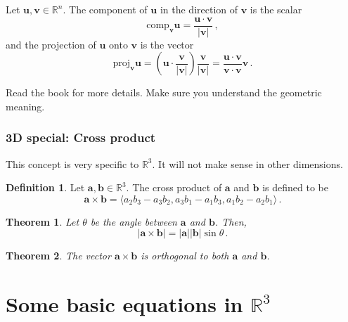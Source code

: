 \documentclass[
]{article}
\newtheorem{theorem}{Theorem}[section]
\theoremstyle{definition}
\newtheorem{definition}{Definition}[section]
\theoremstyle{definition}
\theoremstyle{definition}
\theoremstyle{definition}
\theoremstyle{remark}
\begin{document}
Let \(\textbf{u}, \textbf{v}\in \mathbb{R}^n\). The component of \(\textbf{u}\)
in the direction of \(\textbf{v}\) is the scalar
\begin{equation*}
\mathrm{comp}_{\mathbf{v}}\mathbf{u} = \frac{\mathbf{u}\cdot \mathbf{v}}{|\mathbf{v}|} \,,
\end{equation*}
and the projection of \(\mathbf{u}\) onto \(\mathbf{v}\) is the vector
\begin{equation*}
    \mathrm{proj}_{\mathbf{v}}\mathbf{u} 
    =\left( \mathbf{u}\cdot \frac{\mathbf{v}}{|\mathbf{v}|}\right) \frac{\mathbf{v}}{|\mathbf{v}|} 
    = \frac{\mathbf{u}\cdot \mathbf{v}}{\mathbf{v} \cdot\mathbf{v}} \mathbf{v} \,.
\end{equation*}

Read the book for more details.
Make sure you understand the geometric meaning.

\hypertarget{d-special-cross-product}{%
\subsubsection{3D special: Cross product}\label{d-special-cross-product}}

This concept is very specific to \(\mathbb{R}^3\).
It will not make sense in other dimensions.

\begin{definition}
Let \(\mathbf{a}, \mathbf{b} \in \mathbb{R}^3\).
The cross product of \(\mathbf{a}\) and \(\mathbf{b}\) is defined to be
\begin{equation*}
    \mathbf{a} \times \mathbf{b} = \langle a_2 b_3 - a_3 b_2, a_3b_1 - a_1 b_3, a_1b_2 - a_2b_1 \rangle \,.
\end{equation*}
\end{definition}

\begin{theorem}
Let \(\theta\) be the angle between \(\mathbf{a}\) and \(\mathbf{b}\). Then,
\begin{equation*}
    | \mathbf{a} \times \mathbf{b} | = |\mathbf{a}||\mathbf{b}| \sin\theta \,.
\end{equation*}
\end{theorem}

\begin{theorem}
The vector \(\mathbf{a}\times \mathbf{b}\) is orthogonal to both \(\mathbf{a}\) and \(\mathbf{b}\).
\end{theorem}

\newpage

\hypertarget{some-basic-equations-in-mathbbr3}{%
\section{\texorpdfstring{Some basic equations in \(\mathbb{R}^3\)}{Some basic equations in \textbackslash mathbb\{R\}\^{}3}}\label{some-basic-equations-in-mathbbr3}}
\end{document}

